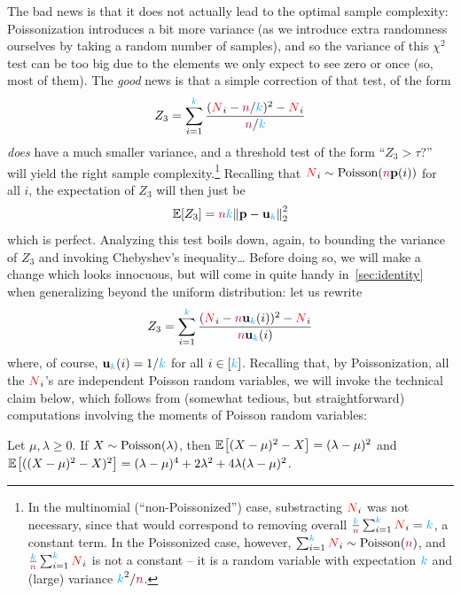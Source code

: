 The bad news is that it does not actually lead to the optimal sample complexity: Poissonization introduces a bit more variance (as we introduce extra randomness ourselves by taking a random number of samples), and so the variance of this $\chi^2$ test can be too big due to the elements we only expect to see zero or once (so, most of them). The \emph{good} news is that a simple correction of that test, of the form
\begin{equation}
  \label{eq:def:z3}
    Z_3 = \sum_{i=1}^{\textcolor{cyan}{k}} \frac{(\textcolor{red}{N}_i-{\textcolor{purple}{n}}/{\textcolor{cyan}{k}})^2- \textcolor{red}{N}_i}{{\textcolor{purple}{n}}/{\textcolor{cyan}{k}}}
\end{equation}
\emph{does} have a much smaller variance, and a threshold test of the form ``$Z_3 > \tau$?'' will yield the right sample complexity.\footnote{In the multinomial (``non-Poissonized'') case, substracting $\textcolor{red}{N}_i$ was not necessary, since that would correspond to removing overall $\frac{{\textcolor{cyan}{k}}}{{\textcolor{purple}{n}}}\sum_{i=1}^{\textcolor{cyan}{k}} \textcolor{red}{N}_i = {\textcolor{cyan}{k}}$, a constant term. In the Poissonized case, however, $\sum_{i=1}^\ab \occur_i\sim\poisson{\ns}$, and $\frac{{\textcolor{cyan}{k}}}{{\textcolor{purple}{n}}}\sum_{i=1}^{\textcolor{cyan}{k}} \textcolor{red}{N}_i$ is not a constant -- it is a random variable with expectation ${\textcolor{cyan}{k}}$ and (large) variance ${\textcolor{cyan}{k}}^2/{\textcolor{purple}{n}}$.} Recalling that $\occur_i\sim\poisson{\ns\p(i)}$ for all $i$, the expectation of $Z_3$ will then just be 
\begin{equation}
  \label{eq:expectation:z3}
    \expect{Z_3} = \ns\ab \normtwo{\p-\uniform_\ab}^2
\end{equation}
which is perfect. Analyzing this test boils down, again, to bounding the variance of $Z_3$ and invoking Chebyshev's inequality\dots{} Before doing so, we will make a change which looks innocuous, but will come in quite handy in~\cref{sec:identity} when generalizing beyond the uniform distribution: let us rewrite
\[
    Z_3 = \sum_{i=1}^{\textcolor{cyan}{k}} \frac{(\textcolor{red}{N}_i-{\textcolor{purple}{n}}\mathbf{u}_{\textcolor{cyan}{k}}(i))^2- \textcolor{red}{N}_i}{{\textcolor{purple}{n}}\mathbf{u}_{\textcolor{cyan}{k}}(i)}
\]
where, of course, $\mathbf{u}_{\textcolor{cyan}{k}}(i) = 1/{\textcolor{cyan}{k}}$ for all $i\in[{\textcolor{cyan}{k}}]$. Recalling that, by Poissonization, all the $\textcolor{red}{N}_i$'s are independent Poisson random variables, we will invoke the technical claim below, which follows from (somewhat tedious, but straightforward) computations involving the moments of Poisson random variables:
\begin{claim}
  \label{claim:uniformity:moments:poisson}
  Let $\mu, \lambda \geq 0$. If $X\sim\poisson{\lambda}$, then 
  $
  \bEE{(X-\mu)^2-X} = (\lambda-\mu)^2
  $
  and 
  $
  \bEE{((X-\mu)^2-X)^2} = (\lambda-\mu)^4 + 2\lambda^2 + 4\lambda(\lambda-\mu)^2
  $.
\end{claim}
